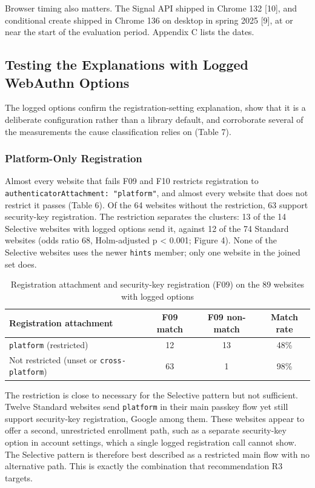 \documentclass[letterpaper,twocolumn,10pt]{article}
\begin{document}
Browser timing also matters. The Signal API shipped in Chrome 132 {[}10{]}, and conditional create shipped in Chrome 136 on desktop in spring 2025 {[}9{]}, at or near the start of the evaluation period. Appendix C lists the dates.

\subsection{Testing the Explanations with Logged WebAuthn Options}

The logged options confirm the registration-setting explanation, show that it is a deliberate configuration rather than a library default, and corroborate several of the measurements the cause classification relies on (Table 7).

\subsubsection{Platform-Only Registration}

Almost every website that fails F09 and F10 restricts registration to \texttt{authenticatorAttachment:\ "platform"}, and almost every website that does not restrict it passes (Table 6). Of the 64 websites without the restriction, 63 support security-key registration. The restriction separates the clusters: 13 of the 14 Selective websites with logged options send it, against 12 of the 74 Standard websites (odds ratio 68, Holm-adjusted p \textless{} 0.001; Figure 4). None of the Selective websites uses the newer \texttt{hints} member; only one website in the joined set does.

\begin{table}[t]\centering\footnotesize\setlength{\tabcolsep}{3pt}\caption{Registration attachment and security-key registration (F09) on the 89 websites with logged options}\label{tab:6}
\begin{tabularx}{\columnwidth}{>{\raggedright\arraybackslash}Xccc}\toprule
\textbf{Registration attachment} & \textbf{F09 match} & \textbf{F09 non-match} & \textbf{Match rate} \\ \midrule
\texttt{platform} (restricted) & 12 & 13 & 48\% \\
Not restricted (unset or \texttt{cross-platform}) & 63 & 1 & 98\% \\
\bottomrule\end{tabularx}\end{table}

The restriction is close to necessary for the Selective pattern but not sufficient. Twelve Standard websites send \texttt{platform} in their main passkey flow yet still support security-key registration, Google among them. These websites appear to offer a second, unrestricted enrollment path, such as a separate security-key option in account settings, which a single logged registration call cannot show. The Selective pattern is therefore best described as a restricted main flow with no alternative path. This is exactly the combination that recommendation R3 targets.
\end{document}
